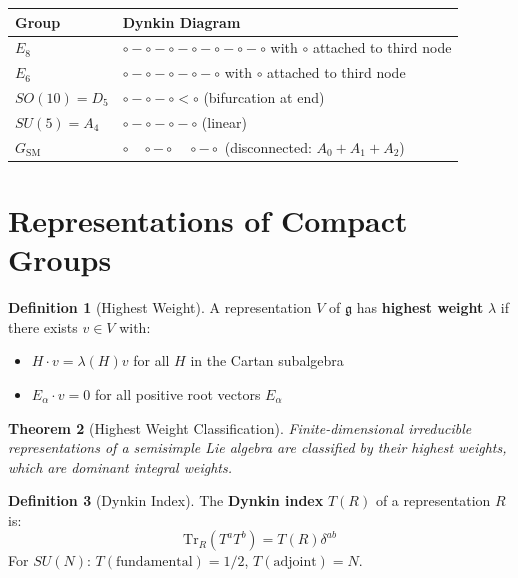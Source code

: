 \documentclass[11pt,a4paper,openright]{book}
\theoremstyle{plain}
\newtheorem{theorem}{Theorem}[chapter]
\theoremstyle{definition}
\newtheorem{definition}[theorem]{Definition}
\newcommand{\SM}{\mathrm{SM}}
\newcommand{\Tr}{\mathrm{Tr}}
\newcommand{\g}{\mathfrak{g}}
\begin{document}
\begin{center}
\begin{tabular}{ll}
\toprule
\textbf{Group} & \textbf{Dynkin Diagram} \\
\midrule
$E_8$ & $\circ - \circ - \circ - \circ - \circ - \circ - \circ$ with $\circ$ attached to third node \\
$E_6$ & $\circ - \circ - \circ - \circ - \circ$ with $\circ$ attached to third node \\
$SO(10) = D_5$ & $\circ - \circ - \circ < \circ$ (bifurcation at end) \\
$SU(5) = A_4$ & $\circ - \circ - \circ - \circ$ (linear) \\
$G_{\SM}$ & $\circ \quad \circ - \circ \quad \circ - \circ$ (disconnected: $A_0 + A_1 + A_2$) \\
\bottomrule
\end{tabular}
\end{center}

\section{Representations of Compact Groups}

\begin{definition}[Highest Weight]
A representation $V$ of $\g$ has \textbf{highest weight} $\lambda$ if there exists $v \in V$ with:
\begin{itemize}
    \item $H \cdot v = \lambda(H) v$ for all $H$ in the Cartan subalgebra
    \item $E_\alpha \cdot v = 0$ for all positive root vectors $E_\alpha$
\end{itemize}
\end{definition}

\begin{theorem}[Highest Weight Classification]
Finite-dimensional irreducible representations of a semisimple Lie algebra are classified by their highest weights, which are dominant integral weights.
\end{theorem}

\begin{definition}[Dynkin Index]
The \textbf{Dynkin index} $T(R)$ of a representation $R$ is:
\begin{equation}
\Tr_R(T^a T^b) = T(R) \delta^{ab}
\end{equation}
For $SU(N)$: $T(\text{fundamental}) = 1/2$, $T(\text{adjoint}) = N$.
\end{definition}
\end{document}
